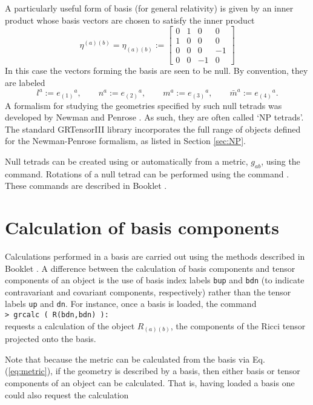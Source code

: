 \documentclass{article}
\begin{document}
A particularly useful form of basis (for general relativity) is given
by an inner product whose basis vectors are chosen to satisfy the inner
product
\[
  \eta^{(a)(b)} = \eta_{(a)(b)} :=
    \left[
      \begin{array}{cccc}
        0 & 1 & 0 & 0 \\
        1 & 0 & 0 & 0 \\
        0 & 0 & 0 &-1 \\
        0 & 0 &-1 & 0
      \end{array}
    \right]
\]
In this case the vectors forming the basis are seen to be null. By
convention, they are labeled
\[
  l^a := e_{(1)}{}^a, \qquad n^a := e_{(2)}{}^a, \qquad
  m^a := e_{(3)}{}^a, \qquad \bar{m}^a := e_{(4)}{}^a.
\]
A formalism for studying the geometries specified by such null tetrads
was developed by Newman and Penrose \cite{newman/penrose:1962}. As such,
they are often called `NP tetrads'. The standard GRTensorIII library
incorporates the full range of objects defined for the Newman-Penrose
formalism, as listed in Section \ref{sec:NP}.

Null tetrads can be created using  or automatically from
a metric, $g_{ab}$, using the  command. Rotations of
a null tetrad can be performed using the command .
These commands are described in Booklet \grMakegRef.
%
\section{Calculation of basis components}
%
Calculations performed in a basis are carried out using the methods
described in Booklet \grCalcRef. A difference between the
calculation of basis components and tensor components of an object is
the use of basis index labels \texttt{bup} and \texttt{bdn} (to
indicate contravariant and covariant components, respectively) rather
than the tensor labels \texttt{up} and \texttt{dn}. For instance,
once a basis is loaded, the command\\

\noindent\texttt{> grcalc ( R(bdn,bdn) ):}\\

\noindent requests a calculation of the object $R_{(a)(b)}$, the
components of the Ricci tensor projected onto the basis.

Note that because the metric can be calculated from the basis via
Eq. (\ref{eq:metric}), if the geometry is described by a basis, then
either basis or tensor components of an object can be calculated. That
is, having loaded a basis one could also request the calculation\\
\end{document}
